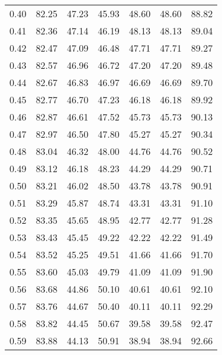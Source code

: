 \begin{tabular}{|c|c|c|c|c|c|c|}
      0.40 &     82.25 &     47.23 &      45.93 &   48.60 &      48.60 &         88.82 \\
      0.41 &     82.36 &     47.14 &      46.19 &   48.13 &      48.13 &         89.04 \\
      0.42 &     82.47 &     47.09 &      46.48 &   47.71 &      47.71 &         89.27 \\
      0.43 &     82.57 &     46.96 &      46.72 &   47.20 &      47.20 &         89.48 \\
      0.44 &     82.67 &     46.83 &      46.97 &   46.69 &      46.69 &         89.70 \\
      0.45 &     82.77 &     46.70 &      47.23 &   46.18 &      46.18 &         89.92 \\
      0.46 &     82.87 &     46.61 &      47.52 &   45.73 &      45.73 &         90.13 \\
      0.47 &     82.97 &     46.50 &      47.80 &   45.27 &      45.27 &         90.34 \\
      0.48 &     83.04 &     46.32 &      48.00 &   44.76 &      44.76 &         90.52 \\
      0.49 &     83.12 &     46.18 &      48.23 &   44.29 &      44.29 &         90.71 \\
      0.50 &     83.21 &     46.02 &      48.50 &   43.78 &      43.78 &         90.91 \\
      0.51 &     83.29 &     45.87 &      48.74 &   43.31 &      43.31 &         91.10 \\
      0.52 &     83.35 &     45.65 &      48.95 &   42.77 &      42.77 &         91.28 \\
      0.53 &     83.43 &     45.45 &      49.22 &   42.22 &      42.22 &         91.49 \\
      0.54 &     83.52 &     45.25 &      49.51 &   41.66 &      41.66 &         91.70 \\
      0.55 &     83.60 &     45.03 &      49.79 &   41.09 &      41.09 &         91.90 \\
      0.56 &     83.68 &     44.86 &      50.10 &   40.61 &      40.61 &         92.10 \\
      0.57 &     83.76 &     44.67 &      50.40 &   40.11 &      40.11 &         92.29 \\
      0.58 &     83.82 &     44.45 &      50.67 &   39.58 &      39.58 &         92.47 \\
      0.59 &     83.88 &     44.13 &      50.91 &   38.94 &      38.94 &         92.66 \\

\end{tabular}
